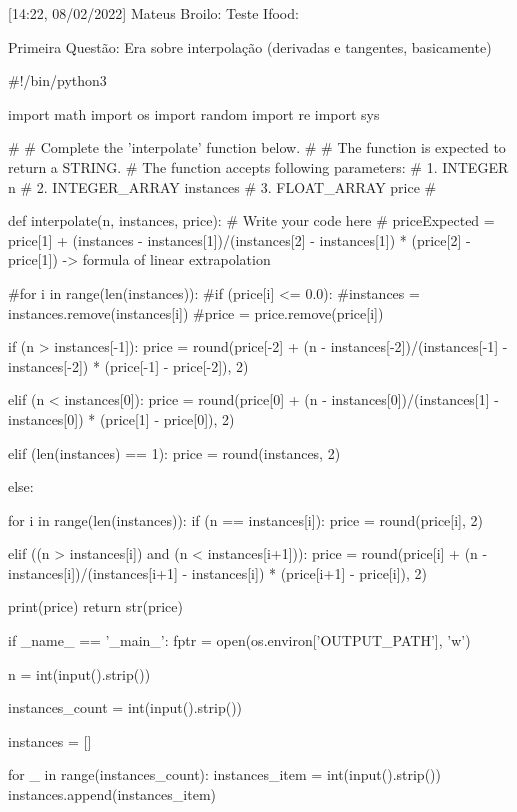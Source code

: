 [14:22, 08/02/2022] Mateus Broilo: Teste Ifood:

Primeira Questão: Era sobre interpolação (derivadas e tangentes, basicamente)

#!/bin/python3

import math
import os
import random
import re
import sys


#
# Complete the 'interpolate' function below.
#
# The function is expected to return a STRING.
# The function accepts following parameters:
#  1. INTEGER n
#  2. INTEGER_ARRAY instances
#  3. FLOAT_ARRAY price
#

def interpolate(n, instances, price):
    # Write your code here
    # priceExpected = price[1] + (instances - instances[1])/(instances[2] - instances[1]) * (price[2] - price[1]) -> formula of linear extrapolation
    
    #for i in range(len(instances)):
        #if (price[i] <= 0.0):
            #instances = instances.remove(instances[i])
            #price = price.remove(price[i])
        
    
    if (n > instances[-1]):
        price = round(price[-2] + (n - instances[-2])/(instances[-1] - instances[-2]) * (price[-1] - price[-2]), 2)

    elif (n < instances[0]):
        price = round(price[0] + (n - instances[0])/(instances[1] - instances[0]) * (price[1] - price[0]), 2)
    
    elif (len(instances) == 1):
        price = round(instances, 2)
        
    else:
        
        for i in range(len(instances)):
            if (n == instances[i]):
                price = round(price[i], 2)
                
            elif ((n > instances[i]) and (n < instances[i+1])):
                price = round(price[i] + (n - instances[i])/(instances[i+1] - instances[i]) * (price[i+1] - price[i]), 2)
                

    
    print(price)
    return str(price)
    
if _name_ == '_main_':
    fptr = open(os.environ['OUTPUT_PATH'], 'w')

    n = int(input().strip())

    instances_count = int(input().strip())

    instances = []

    for _ in range(instances_count):
        instances_item = int(input().strip())
        instances.append(instances_item)


